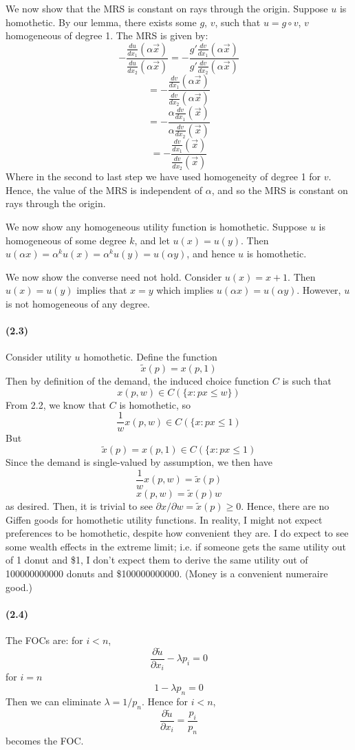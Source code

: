 \documentclass[10pt,letter]{article}
\begin{document}
We now show that the MRS is constant on rays through the origin. Suppose $u$ is homothetic. By our lemma, there exists some $g$, $v$, such that $u = g \circ v$, $v$ homogeneous of degree 1. The MRS is given by:
\[ - \frac{\frac{du}{dx_1}(\alpha \vec{x})}{\frac{du}{dx_2}(\alpha \vec{x})} = -\frac{g' \frac{dv}{dx_1}(\alpha \vec{x})}{g' \frac{dv}{dx_2}(\alpha \vec{x})} \]
\[ = - \frac{\frac{dv}{dx_1}(\alpha \vec{x})}{\frac{dv}{dx_2}(\alpha \vec{x})} \]
\[ = - \frac{\alpha \frac{dv}{dx_1}(\vec{x})}{\alpha \frac{dv}{dx_2}(\vec{x})} \]
\[ = - \frac{\frac{dv}{dx_1}(\vec{x})}{\frac{dv}{dx_2}(\vec{x})} \]
Where in the second to last step we have used homogeneity of degree 1 for $v$. Hence, the value of the MRS is independent of $\alpha$, and so the MRS is constant on rays through the origin.

We now show any homogeneous utility function is homothetic. Suppose $u$ is homogeneous of some degree $k$, and let $u(x) = u(y)$. Then $u(\alpha x) = \alpha^k u(x) = \alpha^k u(y) = u(\alpha y)$, and hence $u$ is homothetic.

We now show the converse need not hold. Consider $u(x) = x + 1$. Then $u(x) = u(y)$ implies that $x = y$ which implies $u(\alpha x) = u(\alpha y)$. However, $u$ is not homogeneous of any degree.
\paragraph{(2.3)}
Consider utility $u$ homothetic. Define the function
\[ \tilde{x}(p) = x(p,1) \]
Then by definition of the demand, the induced choice function $C$ is such that
\[ x(p,w) \in C(\{ x : px \le w\}) \]
From 2.2, we know that $C$ is homothetic, so
\[ \frac{1}{w}x(p,w) \in C(\{ x: px \le 1) \]
But
\[ \tilde{x}(p) = x(p,1) \in C(\{ x: px \le 1) \]
Since the demand is single-valued by assumption, we then have
\[\frac{1}{w}x(p,w) = \tilde{x}(p) \]
\[ x(p,w) =\tilde{x}(p) w \]
as desired. Then, it is trivial to see $\partial x / \partial w = \tilde{x}(p) \ge 0$. Hence, there are no Giffen goods for homothetic utility functions. In reality, I might not expect preferences to be homothetic, despite how convenient they are. I do expect to see some wealth effects in the extreme limit; i.e. if someone gets the same utility out of 1 donut and \$1, I don't expect them to derive the same utility out of 100000000000 donuts and \$100000000000. (Money is a convenient numeraire good.)
\paragraph{(2.4)}
The FOCs are: for $i < n$,
\[ \frac{\partial \tilde{u}}{\partial x_i} - \lambda p_i = 0 \]
for $i = n$
\[ 1- \lambda p_n = 0 \]
Then we can eliminate $\lambda = 1/p_n$. Hence for $i < n$,
\[ \frac{\partial \tilde{u}}{\partial x_i} = \frac{p_i}{p_n} \]
becomes the FOC.
\end{document}
